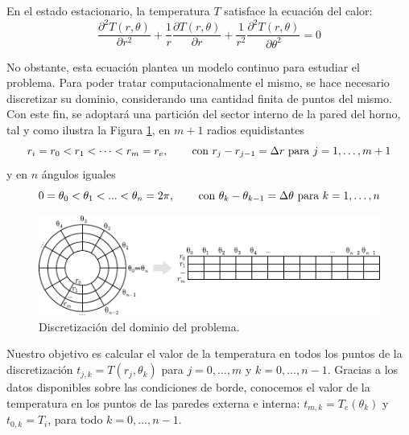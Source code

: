         En el estado estacionario, la temperatura $T$ satisface la ecuación del calor:
        \begin{equation} \label{eq:calor}
            \frac{\partial^2 T(r, \theta)}{\partial r^2} + \frac{1}{r} \frac{\partial T(r, \theta)}{\partial r} + \frac{1}{r^2} \frac{\partial^2 T(r, \theta)}{\partial \theta^2} = 0
        \end{equation}

        No obstante, esta ecuación plantea un modelo continuo para estudiar el problema. Para poder tratar computacionalmente el mismo, se hace necesario discretizar su dominio, considerando una cantidad finita de puntos del mismo. Con este fin, se adoptará una partición del sector interno de la pared del horno, tal y como ilustra la Figura \ref{fig:discretizacion}, en $m + 1$ radios equidistantes 
        \[ r_i = r_0 < r_1 < \dots < r_m = r_e \text{, \qquad con } r_j - r_{j-1} = \Delta r \text{ para } j = 1, \dots, m+1 \]
        y en $n$ ángulos iguales
        \[ 0 = \theta_0 < \theta_1 < ... < \theta_n = 2\pi \text{, \qquad con } \theta_k - \theta_{k-1} = \Delta \theta \text{ para } k = 1, \dots, n \]

        \begin{figure}[h]
          \centering

          \includegraphics{imagenes/discretizacion.pdf}

          \caption{Discretización del dominio del problema.}
          \label{fig:discretizacion}
        \end{figure}

        Nuestro objetivo es calcular el valor de la temperatura en todos los puntos de la discretización $t_{j,k} = T(r_j, \theta_k)$ para $j = 0, \dots, m$ y $k = 0, \dots, n-1$. Gracias a los datos disponibles sobre las condiciones de borde, conocemos el valor de la temperatura en los puntos de las paredes externa e interna: $t_{m,k} = T_e(\theta_k)$ y $t_{0,k} = T_i$, para todo $k = 0, \dots, n-1$.

